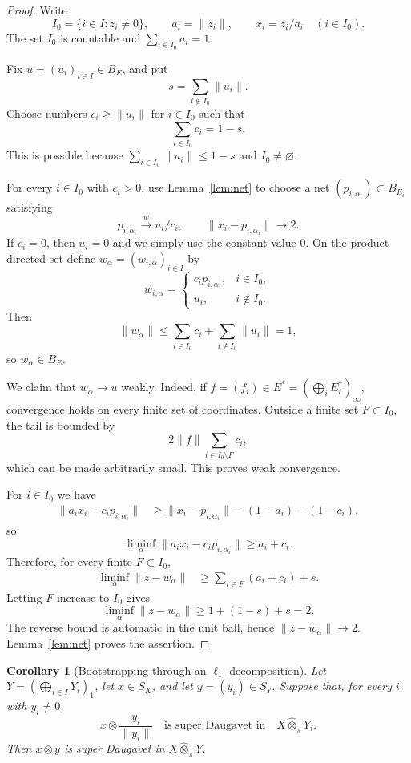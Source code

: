 \documentclass[11pt]{article}
\newtheorem{corollary}[theorem]{Corollary}
\theoremstyle{definition}
\newcommand{\whotpi}{\widehat{\otimes}_{\pi}}
\begin{document}
\begin{proof}
Write
\[
 I_0=\{i\in I:z_i\ne0\},\qquad
 a_i=\|z_i\|,\qquad x_i=z_i/a_i\quad(i\in I_0).
\]
The set $I_0$ is countable and $\sum_{i\in I_0}a_i=1$.

Fix $u=(u_i)_{i\in I}\in B_E$, and put
\[
 s=\sum_{i\notin I_0}\|u_i\|.
\]
Choose numbers $c_i\ge\|u_i\|$ for $i\in I_0$ such that
\[
       \sum_{i\in I_0}c_i=1-s.
\]
This is possible because
$\sum_{i\in I_0}\|u_i\|\le1-s$ and $I_0\ne\varnothing$.

For every $i\in I_0$ with $c_i>0$, use Lemma~\ref{lem:net} to choose a net
$(p_{i,\alpha_i})\subset B_{E_i}$ satisfying
\[
 p_{i,\alpha_i}\xrightarrow{w}u_i/c_i,
 \qquad
 \|x_i-p_{i,\alpha_i}\|\longrightarrow2.
\]
If $c_i=0$, then $u_i=0$ and we simply use the constant value $0$.  On the
product directed set define $w_\alpha=(w_{i,\alpha})_{i\in I}$ by
\[
 w_{i,\alpha}=
 \begin{cases}
   c_i p_{i,\alpha_i},&i\in I_0,\\
   u_i,&i\notin I_0.
 \end{cases}
\]
Then
\[
 \|w_\alpha\|
 \le \sum_{i\in I_0}c_i+
       \sum_{i\notin I_0}\|u_i\|=1,
\]
so $w_\alpha\in B_E$.

We claim that $w_\alpha\to u$ weakly.  Indeed, if
$f=(f_i)\in E^*=(\bigoplus_iE_i^*)_\infty$, convergence holds on every
finite set of coordinates.  Outside a finite set $F\subset I_0$, the tail is
bounded by
\[
  2\|f\|\sum_{i\in I_0\setminus F}c_i,
\]
which can be made arbitrarily small.  This proves weak convergence.

For $i\in I_0$ we have
\begin{align*}
 \|a_ix_i-c_ip_{i,\alpha_i}\|
 &\ge \|x_i-p_{i,\alpha_i}\|-(1-a_i)-(1-c_i),
\end{align*}
so
\[
 \liminf_\alpha\|a_ix_i-c_ip_{i,\alpha_i}\|\ge a_i+c_i.
\]
Therefore, for every finite $F\subset I_0$,
\begin{align*}
 \liminf_\alpha\|z-w_\alpha\|
 &\ge \sum_{i\in F}(a_i+c_i)+s.
\end{align*}
Letting $F$ increase to $I_0$ gives
\[
 \liminf_\alpha\|z-w_\alpha\|
 \ge 1+(1-s)+s=2.
\]
The reverse bound is automatic in the unit ball, hence
$\|z-w_\alpha\|\to2$.  Lemma~\ref{lem:net} proves the assertion.
\end{proof}

\begin{corollary}[Bootstrapping through an $\ell_1$ decomposition]
\label{cor:bootstrap}
Let $Y=(\bigoplus_{i\in I}Y_i)_1$, let $x\in S_X$, and let
$y=(y_i)\in S_Y$.  Suppose that, for every $i$ with $y_i\ne0$,
\[
 x\otimes \frac{y_i}{\|y_i\|}
 \quad\text{is super Daugavet in}\quad X\whotpi Y_i.
\]
Then $x\otimes y$ is super Daugavet in $X\whotpi Y$.
\end{corollary}
\end{document}
